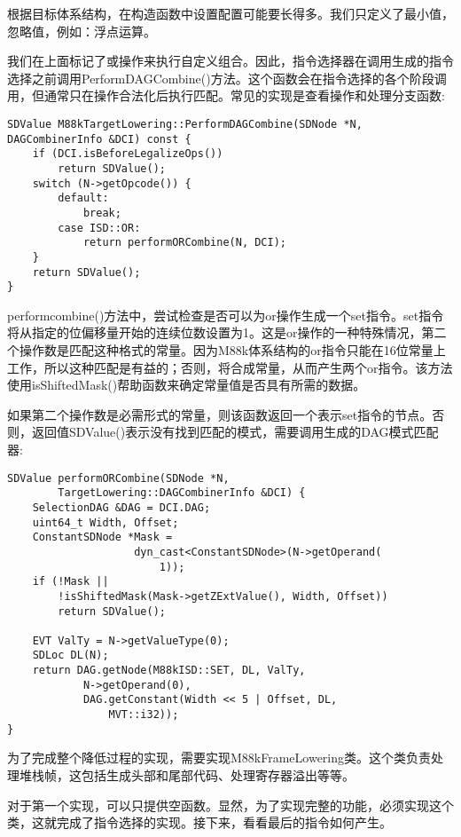 根据目标体系结构，在构造函数中设置配置可能要长得多。我们只定义了最小值，忽略值，例如：浮点运算。\par

我们在上面标记了或操作来执行自定义组合。因此，指令选择器在调用生成的指令选择之前调用PerformDAGCombine()方法。这个函数会在指令选择的各个阶段调用，但通常只在操作合法化后执行匹配。常见的实现是查看操作和处理分支函数:\par

\begin{lstlisting}[caption={}]
SDValue M88kTargetLowering::PerformDAGCombine(SDNode *N,
DAGCombinerInfo &DCI) const {
	if (DCI.isBeforeLegalizeOps())
		return SDValue();
	switch (N->getOpcode()) {
		default:
			break;
		case ISD::OR:
			return performORCombine(N, DCI);
	}
	return SDValue();
}
\end{lstlisting}

performcombine()方法中，尝试检查是否可以为or操作生成一个set指令。set指令将从指定的位偏移量开始的连续位数设置为1。这是or操作的一种特殊情况，第二个操作数是匹配这种格式的常量。因为M88k体系结构的or指令只能在16位常量上工作，所以这种匹配是有益的；否则，将合成常量，从而产生两个or指令。该方法使用isShiftedMask()帮助函数来确定常量值是否具有所需的数据。\par

如果第二个操作数是必需形式的常量，则该函数返回一个表示set指令的节点。否则，返回值SDValue()表示没有找到匹配的模式，需要调用生成的DAG模式匹配器:\par

\begin{lstlisting}[caption={}]
SDValue performORCombine(SDNode *N,
		TargetLowering::DAGCombinerInfo &DCI) {
	SelectionDAG &DAG = DCI.DAG;
	uint64_t Width, Offset;
	ConstantSDNode *Mask =
					dyn_cast<ConstantSDNode>(N->getOperand(
						1));
	if (!Mask ||
		!isShiftedMask(Mask->getZExtValue(), Width, Offset))
		return SDValue();
	
	EVT ValTy = N->getValueType(0);
	SDLoc DL(N);
	return DAG.getNode(M88kISD::SET, DL, ValTy,
			N->getOperand(0),
			DAG.getConstant(Width << 5 | Offset, DL,
				MVT::i32));
}
\end{lstlisting}

为了完成整个降低过程的实现，需要实现M88kFrameLowering类。这个类负责处理堆栈帧，这包括生成头部和尾部代码、处理寄存器溢出等等。\par

对于第一个实现，可以只提供空函数。显然，为了实现完整的功能，必须实现这个类，这就完成了指令选择的实现。接下来，看看最后的指令如何产生。\par





























